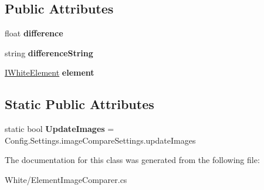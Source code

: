 \subsection*{Public Attributes}
\begin{DoxyCompactItemize}
\item 
\hypertarget{class_proto_test_1_1_golem_1_1_white_1_1_element_image_comparer_a2069600e32326c77c67f88a624a73503}{float {\bfseries difference}}\label{class_proto_test_1_1_golem_1_1_white_1_1_element_image_comparer_a2069600e32326c77c67f88a624a73503}

\item 
\hypertarget{class_proto_test_1_1_golem_1_1_white_1_1_element_image_comparer_a80fa3112a984cf1413c5baf46185ecce}{string {\bfseries difference\-String}}\label{class_proto_test_1_1_golem_1_1_white_1_1_element_image_comparer_a80fa3112a984cf1413c5baf46185ecce}

\item 
\hypertarget{class_proto_test_1_1_golem_1_1_white_1_1_element_image_comparer_a22982dd79a3ea12b4cd3ac3c9a199bd0}{\hyperlink{interface_proto_test_1_1_golem_1_1_white_1_1_elements_1_1_i_white_element}{I\-White\-Element} {\bfseries element}}\label{class_proto_test_1_1_golem_1_1_white_1_1_element_image_comparer_a22982dd79a3ea12b4cd3ac3c9a199bd0}

\end{DoxyCompactItemize}
\subsection*{Static Public Attributes}
\begin{DoxyCompactItemize}
\item 
\hypertarget{class_proto_test_1_1_golem_1_1_white_1_1_element_image_comparer_a110a3dcbf9db905379850a3dc66350fa}{static bool {\bfseries Update\-Images} = Config.\-Settings.\-image\-Compare\-Settings.\-update\-Images}\label{class_proto_test_1_1_golem_1_1_white_1_1_element_image_comparer_a110a3dcbf9db905379850a3dc66350fa}

\end{DoxyCompactItemize}


The documentation for this class was generated from the following file\-:\begin{DoxyCompactItemize}
\item 
White/Element\-Image\-Comparer.\-cs\end{DoxyCompactItemize}
